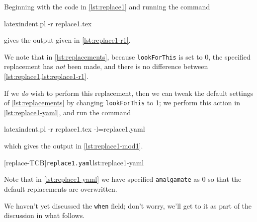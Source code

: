  \begin{example}
 Beginning with the code in \cref{lst:replace1} and running the command

 \begin{commandshell}
latexindent.pl -r replace1.tex
\end{commandshell}

 gives the output given in \cref{lst:replace1-r1}.

 \begin{cmhtcbraster}[raster column skip=.01\linewidth]
 \end{cmhtcbraster}

 We note that in \cref{lst:replacements}, because \texttt{lookForThis} is set to 0, the
 specified replacement has \emph{not} been made, and there is no difference between
 \cref{lst:replace1,lst:replace1-r1}.

 If we \emph{do} wish to perform this replacement, then we can tweak the default settings
 of \vref{lst:replacements} by changing \texttt{lookForThis} to 1; we perform this action
 in \cref{lst:replace1-yaml}, and run the command 

 \begin{commandshell}
latexindent.pl -r replace1.tex -l=replace1.yaml
\end{commandshell}

 which gives the output in \cref{lst:replace1-mod1}.

 \begin{cmhtcbraster}[raster column skip=.01\linewidth]
  [replace-TCB]{\texttt{replace1.yaml}}{lst:replace1-yaml}
 \end{cmhtcbraster}

 Note that in \cref{lst:replace1-yaml} we have specified \texttt{amalgamate} as 0 so that
 the default replacements are overwritten.
 \end{example}

 We haven't yet discussed the \texttt{when} field; don't worry, we'll get to it as part
 of the discussion in what follows.

